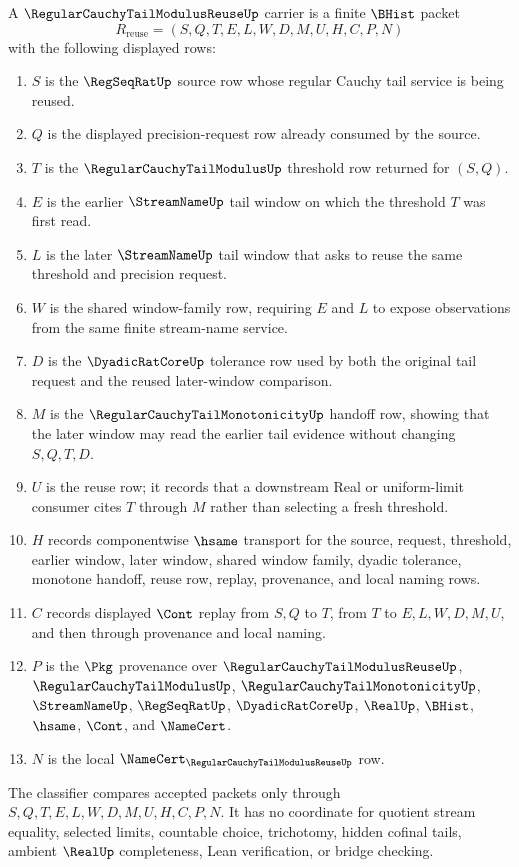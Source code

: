 \begin{definition}
\label{def:regular-cauchy-tail-modulus-reuse-carrier}
A $\RegularCauchyTailModulusReuseUp$ carrier is a finite $\BHist$ packet
$$
R_{\mathrm{reuse}}=(S,Q,T,E,L,W,D,M,U,H,C,P,N)
$$
with the following displayed rows:
\begin{enumerate}
\item $S$ is the $\RegSeqRatUp$ source row whose regular Cauchy tail service is being reused.
\item $Q$ is the displayed precision-request row already consumed by the source.
\item $T$ is the $\RegularCauchyTailModulusUp$ threshold row returned for $(S,Q)$.
\item $E$ is the earlier $\StreamNameUp$ tail window on which the threshold $T$ was first read.
\item $L$ is the later $\StreamNameUp$ tail window that asks to reuse the same threshold and precision request.
\item $W$ is the shared window-family row, requiring $E$ and $L$ to expose observations from the same finite stream-name service.
\item $D$ is the $\DyadicRatCoreUp$ tolerance row used by both the original tail request and the reused later-window comparison.
\item $M$ is the $\RegularCauchyTailMonotonicityUp$ handoff row, showing that the later window may read the earlier tail evidence without changing $S,Q,T,D$.
\item $U$ is the reuse row; it records that a downstream Real or uniform-limit consumer cites $T$ through $M$ rather than selecting a fresh threshold.
\item $H$ records componentwise $\hsame$ transport for the source, request, threshold, earlier window, later window, shared window family, dyadic tolerance, monotone handoff, reuse row, replay, provenance, and local naming rows.
\item $C$ records displayed $\Cont$ replay from $S,Q$ to $T$, from $T$ to $E,L,W,D,M,U$, and then through provenance and local naming.
\item $P$ is the $\Pkg$ provenance over $\RegularCauchyTailModulusReuseUp$, $\RegularCauchyTailModulusUp$, $\RegularCauchyTailMonotonicityUp$, $\StreamNameUp$, $\RegSeqRatUp$, $\DyadicRatCoreUp$, $\RealUp$, $\BHist$, $\hsame$, $\Cont$, and $\NameCert$.
\item $N$ is the local $\NameCert_{\RegularCauchyTailModulusReuseUp}$ row.
\end{enumerate}
The classifier compares accepted packets only through $S,Q,T,E,L,W,D,M,U,H,C,P,N$. It has no coordinate for quotient stream equality, selected limits, countable choice, trichotomy, hidden cofinal tails, ambient $\RealUp$ completeness, Lean verification, or bridge checking.
\end{definition}

